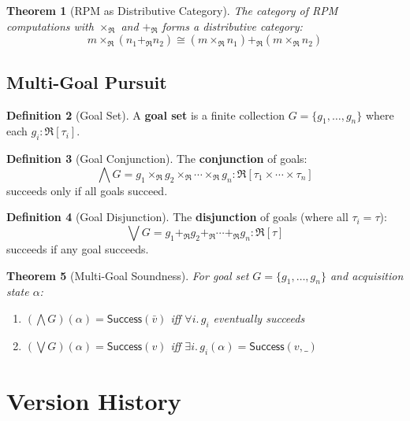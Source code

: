 \documentclass[11pt,twoside,openright]{book}
\theoremstyle{definition}
\newtheorem{definition}{Definition}[chapter]
\theoremstyle{plain}
\newtheorem{theorem}[definition]{Theorem}
\theoremstyle{remark}
\newcommand{\RPM}{\mathfrak{R}}
\begin{document}
\begin{theorem}[RPM as Distributive Category]
\label{thm:rpm-distributive}
The category of RPM computations with $\times_\RPM$ and $+_\RPM$ forms a distributive category:
\[
m \times_\RPM (n_1 +_\RPM n_2) \cong (m \times_\RPM n_1) +_\RPM (m \times_\RPM n_2)
\]
\end{theorem}

\section{Multi-Goal Pursuit}

\begin{definition}[Goal Set]
\label{def:goal-set}
A \textbf{goal set} is a finite collection $G = \{g_1, \ldots, g_n\}$ where each $g_i : \RPM[\tau_i]$.
\end{definition}

\begin{definition}[Goal Conjunction]
\label{def:goal-conj}
The \textbf{conjunction} of goals:
\[
\bigwedge G = g_1 \times_\RPM g_2 \times_\RPM \cdots \times_\RPM g_n : \RPM[\tau_1 \times \cdots \times \tau_n]
\]
succeeds only if all goals succeed.
\end{definition}

\begin{definition}[Goal Disjunction]
\label{def:goal-disj}
The \textbf{disjunction} of goals (where all $\tau_i = \tau$):
\[
\bigvee G = g_1 +_\RPM g_2 +_\RPM \cdots +_\RPM g_n : \RPM[\tau]
\]
succeeds if any goal succeeds.
\end{definition}

\begin{theorem}[Multi-Goal Soundness]
\label{thm:multi-goal-sound}
For goal set $G = \{g_1, \ldots, g_n\}$ and acquisition state $\alpha$:
\begin{enumerate}
  \item $(\bigwedge G)(\alpha) = \mathsf{Success}(\bar{v})$ iff $\forall i.\, g_i$ eventually succeeds
  \item $(\bigvee G)(\alpha) = \mathsf{Success}(v)$ iff $\exists i.\, g_i(\alpha) = \mathsf{Success}(v, \_)$
\end{enumerate}
\end{theorem}


\chapter{Version History}
\label{app:versions}
\end{document}

